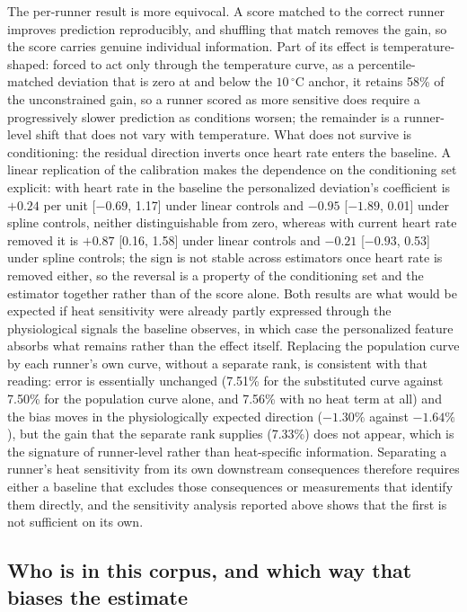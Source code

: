 \documentclass[11pt]{article}
\renewcommand{\_}{\textunderscore\allowbreak}
\begin{document}
The per-runner result is more equivocal. A score matched to the correct runner improves prediction reproducibly, and shuffling that match removes the gain, so the score carries genuine individual information. Part of its effect is temperature-shaped: forced to act only through the temperature curve, as a percentile-matched deviation that is zero at and below the $10\,^{\circ}$C anchor, it retains 58\% of the unconstrained gain, so a runner scored as more sensitive does require a progressively slower prediction as conditions worsen; the remainder is a runner-level shift that does not vary with temperature. What does not survive is conditioning: the residual direction inverts once heart rate enters the baseline. A linear replication of the calibration makes the dependence on the conditioning set explicit: with heart rate in the baseline the personalized deviation's coefficient is $+0.24$ per unit [$-0.69$, 1.17] under linear controls and $-0.95$ [$-1.89$, 0.01] under spline controls, neither distinguishable from zero, whereas with current heart rate removed it is $+0.87$ [0.16, 1.58] under linear controls and $-0.21$ [$-0.93$, 0.53] under spline controls; the sign is not stable across estimators once heart rate is removed either, so the reversal is a property of the conditioning set and the estimator together rather than of the score alone. Both results are what would be expected if heat sensitivity were already partly expressed through the physiological signals the baseline observes, in which case the personalized feature absorbs what remains rather than the effect itself. Replacing the population curve by each runner's own curve, without a separate rank, is consistent with that reading: error is essentially unchanged (7.51\% for the substituted curve against 7.50\% for the population curve alone, and 7.56\% with no heat term at all) and the bias moves in the physiologically expected direction ($-1.30\%$ against $-1.64\%$), but the gain that the separate rank supplies (7.33\%) does not appear, which is the signature of runner-level rather than heat-specific information. Separating a runner's heat sensitivity from its own downstream consequences therefore requires either a baseline that excludes those consequences or measurements that identify them directly, and the sensitivity analysis reported above shows that the first is not sufficient on its own.

\subsection{Who is in this corpus, and which way that biases the estimate}
\label{sec:selection}
\end{document}
